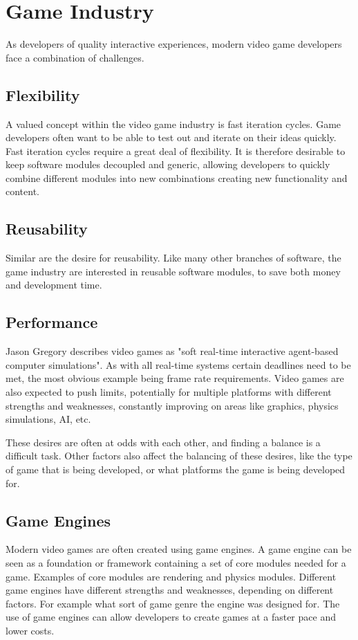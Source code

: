 \section{Game Industry}
As developers of quality interactive experiences, modern video game developers face a
combination of challenges.

\subsection{Flexibility}
A valued concept within the video game industry is fast iteration cycles.
Game developers often want to be able to test out and iterate on their ideas quickly.
Fast iteration cycles require a great deal of flexibility.
It is therefore desirable to keep software modules decoupled and generic,
allowing developers to quickly combine different modules into new combinations creating new functionality
and content.

\subsection{Reusability}
Similar are the desire for reusability.
Like many other branches of software, the game industry are interested in reusable software modules,
to save both money and development time.

\subsection{Performance}
\label{subsec:introduction_game_industry_performance}
Jason Gregory\cite[p. 9]{game_engine_architecture} describes video games as "soft real-time interactive agent-based computer simulations".
As with all real-time systems certain deadlines need to be met, the most obvious example being frame rate requirements.
Video games are also expected to push limits, potentially for multiple platforms with different strengths and weaknesses,
constantly improving on areas like graphics, physics simulations, AI, etc.

These desires are often at odds with each other, and finding a balance is a difficult task.
Other factors also affect the balancing of these desires, like the type of game that is being developed,
or what platforms the game is being developed for.

\subsection{Game Engines}
Modern video games are often created using game engines. A game engine can be seen as a foundation or framework
containing a set of core modules needed for a game. Examples of core modules are rendering and physics modules.
Different game engines have different strengths and weaknesses, depending on different factors.
For example what sort of game genre the engine was designed for.
The use of game engines can allow developers to create games at a faster pace and lower costs.

